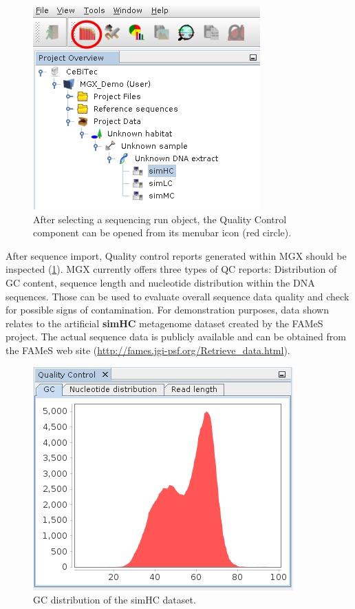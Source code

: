 \begin{figure}[H]
\centering
\includegraphics[width=.6\textwidth]{img/mgx/QCopen}
\caption[Quality control]{After selecting a sequencing run object, the Quality Control component can be opened
from its menubar icon (red circle).}
\label{qcopen}
\end{figure}

After sequence import, Quality control reports generated within MGX should be inspected (\ref{qcopen}).
MGX currently offers three types of QC reports: Distribution of GC content, sequence length
and nucleotide distribution within the DNA sequences. Those can be used to evaluate overall
sequence data quality and check for possible signs of contamination.
For demonstration purposes, data shown relates to the artificial \textbf{simHC} metagenome dataset created by the
FAMeS\cite{SIMMETA} project. The actual sequence data is publicly available and can be obtained from
the FAMeS web site (\url{http://fames.jgi-psf.org/Retrieve_data.html}).

\begin{figure}[H]
\centering
\includegraphics[width=.6\textwidth]{img/mgx/QCgc}
\caption[Quality control]{GC distribution of the simHC dataset.}
\label{qc1}
\end{figure}

